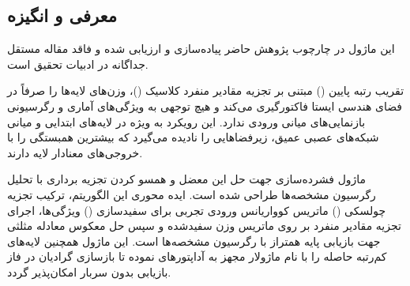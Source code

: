 \subsection{معرفی و انگیزه}
این ماژول در چارچوب پژوهش حاضر پیاده‌سازی و ارزیابی شده و فاقد مقاله مستقل جداگانه در ادبیات تحقیق است.

تقریب رتبه پایین () مبتنی بر تجزیه مقادیر منفرد کلاسیک ()، وزن‌های لایه‌ها را صرفاً در فضای هندسی ایستا فاکتورگیری می‌کند و هیچ توجهی به ویژگی‌های آماری و رگرسیونی بازنمایی‌های میانی ورودی ندارد. این رویکرد به ویژه در لایه‌های ابتدایی و میانی شبکه‌های عصبی عمیق، زیرفضاهایی را نادیده می‌گیرد که بیشترین همبستگی را با خروجی‌های معنادار لایه دارند.

ماژول فشرده‌سازی  جهت حل این معضل و همسو کردن تجزیه برداری با تحلیل رگرسیون مشخصه‌ها طراحی شده است. ایده محوری این الگوریتم، ترکیب تجزیه چولسکی () ماتریس کوواریانس ورودی تجربی برای سفیدسازی () ویژگی‌ها، اجرای تجزیه مقادیر منفرد بر روی ماتریس وزن سفیدشده و سپس حل معکوس معادله مثلثی جهت بازیابی پایه همتراز با رگرسیون مشخصه‌ها است. این ماژول همچنین لایه‌های کم‌رتبه حاصله را با نام ماژولار  مجهز به آداپتورهای  نموده تا بازسازی گرادیان در فاز بازیابی بدون سربار امکان‌پذیر گردد.

